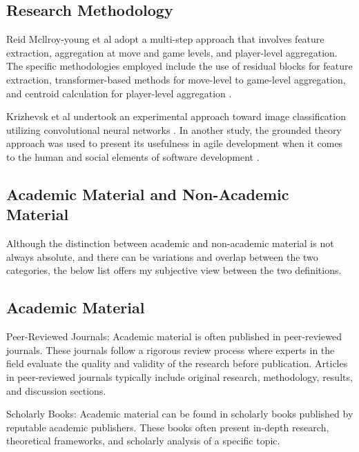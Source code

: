 

\begin{spacing}{2.0}


\section{Research Methodology}

Reid Mcllroy-young et al adopt a multi-step approach that involves feature extraction, aggregation at move and game levels, and player-level aggregation. The specific methodologies employed include the use of residual blocks for feature extraction, transformer-based methods for move-level to game-level aggregation, and centroid calculation for player-level aggregation \cite{stylometryChess}. 

Krizhevsk et al undertook an experimental approach toward image classification utilizing convolutional neural networks \cite{ImageClass}. In another study, the grounded theory approach was used to present its usefulness in agile development when it comes to the human and social elements of software development \cite{agileGrounded}.

\subsection{Academic Material and Non-Academic Material}

Although the distinction between academic and non-academic material is not always absolute, and there can be variations and overlap between the two categories, the below list offers my subjective view between the two definitions. 

\subsection{Academic Material}

Peer-Reviewed Journals: Academic material is often published in peer-reviewed journals. These journals follow a rigorous review process where experts in the field evaluate the quality and validity of the research before publication. Articles in peer-reviewed journals typically include original research, methodology, results, and discussion sections.

Scholarly Books: Academic material can be found in scholarly books published by reputable academic publishers. These books often present in-depth research, theoretical frameworks, and scholarly analysis of a specific topic.


\end{spacing}
